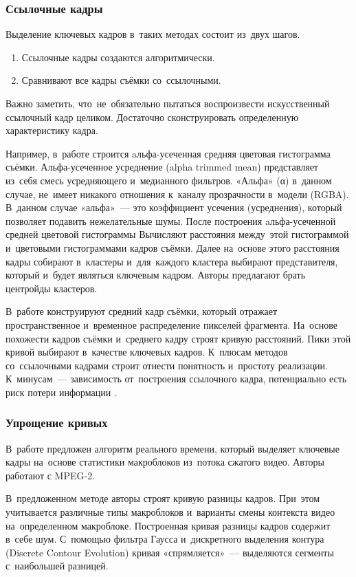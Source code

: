 \subsubsection{Ссылочные кадры}

Выделение ключевых кадров в~таких методах состоит из~двух шагов.
\begin{enumerate}
    \item Ссылочные кадры создаются алгоритмически.
    \item Сравнивают все кадры съёмки со~ссылочными.
\end{enumerate}
Важно заметить, что~не~обязательно пытаться воспроизвести
искусственный ссылочный кадр целиком. Достаточно сконструировать
определенную характеристику кадра.

Например, в~работе \cite{Ferman:2003} строится
aльфа-усеченная средняя цветовая гистограмма съёмки.
Альфа-усеченное усреднение (alpha trimmed mean) представляет из~себя
смесь усредняющего и~медианного фильтров.
«Альфа» (α) в~данном случае, не~имеет никакого отношения к~каналу прозрачности
в~модели (RGBA). В~данном случае «альфа»~— это коэффициент усечения (усреднения),
который позволяет подавить нежелательные шумы.
После построения aльфа-усеченной средней цветовой гистограммы
Вычисляют расстояния между~этой гистограммой и~цветовыми
гистограммами кадров съёмки.
Далее на~основе этого расстояния кадры собирают в~кластеры
и~для~каждого кластера выбирают представителя,
который и~будет являться ключевым кадром.
Авторы предлагают брать центройды кластеров.

В~работе \cite{Sun:2008} конструируют средний кадр съёмки,
который отражает пространственное и~временное распределение
пикселей фрагмента. На~основе похожести кадров съёмки
и~среднего кадру строят кривую расстояний.
Пики этой кривой выбирают в~качестве ключевых кадров.
К~плюсам методов со~ссылочными кадрами строит
отнести понятность и~простоту реализации.
К~минусам~— зависимость от~построения ссылочного кадра,
потенциально есть риск потери информации \cite{Nabeel:2014}.


\subsubsection{Упрощение кривых}

В~работе \cite{Calic:2002} предложен алгоритм реального времени,
который выделяет ключевые кадры на~основе статистики макроблоков
из~потока сжатого видео. Авторы работают с  MPEG-2.

В~предложенном методе авторы строят кривую разницы кадров.
При~этом учитывается различные типы макроблоков
и~варианты смены контекста видео на~определенном макроблоке.
Построенная кривая разницы кадров содержит в~себе шум.
С~помощью фильтра Гаусса
и~дискретного выделения контура (Discrete Contour Evolution)
кривая «спрямляется»~— выделяются сегменты с~наибольшей разницей.


